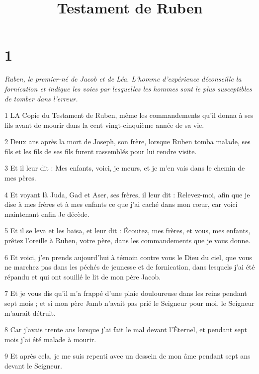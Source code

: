 

\title{Testament de Ruben}

\chapter{1}

\par \textit{Ruben, le premier-né de Jacob et de Léa. L'homme d'expérience déconseille la fornication et indique les voies par lesquelles les hommes sont le plus susceptibles de tomber dans l'erreur.}

\par 1 LA Copie du Testament de Ruben, même les commandements qu'il donna à ses fils avant de mourir dans la cent vingt-cinquième année de sa vie.

\par 2 Deux ans après la mort de Joseph, son frère, lorsque Ruben tomba malade, ses fils et les fils de ses fils furent rassemblés pour lui rendre visite.

\par 3 Et il leur dit : Mes enfants, voici, je meurs, et je m'en vais dans le chemin de mes pères.

\par 4 Et voyant là Juda, Gad et Aser, ses frères, il leur dit : Relevez-moi, afin que je dise à mes frères et à mes enfants ce que j'ai caché dans mon cœur, car voici maintenant enfin Je décède.

\par 5 Et il se leva et les baisa, et leur dit : Écoutez, mes frères, et vous, mes enfants, prêtez l'oreille à Ruben, votre père, dans les commandements que je vous donne.

\par 6 Et voici, j'en prends aujourd'hui à témoin contre vous le Dieu du ciel, que vous ne marchez pas dans les péchés de jeunesse et de fornication, dans lesquels j'ai été répandu et qui ont souillé le lit de mon père Jacob.

\par 7 Et je vous dis qu'il m'a frappé d'une plaie douloureuse dans les reins pendant sept mois ; et si mon père Jamb n'avait pas prié le Seigneur pour moi, le Seigneur m'aurait détruit.

\par 8 Car j'avais trente ans lorsque j'ai fait le mal devant l'Éternel, et pendant sept mois j'ai été malade à mourir.

\par 9 Et après cela, je me suis repenti avec un dessein de mon âme pendant sept ans devant le Seigneur.

